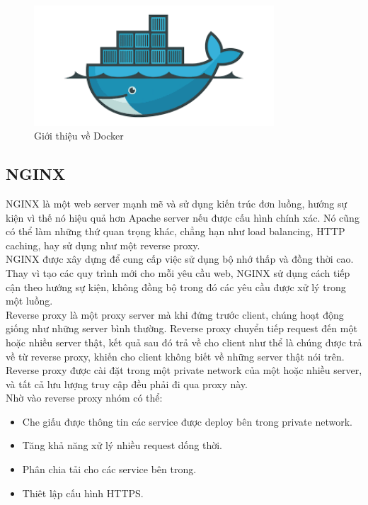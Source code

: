 			 \begin{figure}[H]
            	\includegraphics[width=0.8\textwidth]{Images/docker.png}
            	\centering
            	\linebreak
            	\caption{Giới thiệu về Docker}
            \end{figure}
            
            
            \subsection{NGINX}
            
            NGINX\cite{nginx} là một web server mạnh mẽ và sử dụng kiến trúc đơn luồng, hướng sự kiện vì thế nó hiệu quả hơn Apache server nếu được cấu hình chính xác. Nó cũng có thể làm những thứ quan trọng khác, chẳng hạn như load balancing, HTTP caching, hay sử dụng như một reverse proxy.\\
            
            NGINX được xây dựng để cung cấp việc sử dụng bộ nhớ thấp và đồng thời cao. Thay vì tạo các quy trình mới cho mỗi yêu cầu web, NGINX sử dụng cách tiếp cận theo hướng sự kiện, không đồng bộ trong đó các yêu cầu được xử lý trong một luồng.\\
            
            Reverse proxy là một proxy server mà khi đứng trước client, chúng hoạt động giống như những server bình thường. Reverse proxy chuyển tiếp request đến một hoặc nhiều server thật, kết quả sau đó trả về cho client như thể là chúng được trả về từ reverse proxy, khiến cho client không biết về những server thật nói trên. Reverse proxy được cài đặt trong một private network của một hoặc nhiều server, và tất cả lưu lượng truy cập đều phải đi qua proxy này.\\
            
            Nhờ vào reverse proxy nhóm có thể:
            
            \begin{itemize}
                \item Che giấu được thông tin các service được deploy bên trong private network.
                \item Tăng khả năng xử lý nhiều request dống thời.
                \item Phân chia tải cho các service bên trong.
                \item Thiêt lập cấu hình HTTPS.
            \end{itemize}
        

